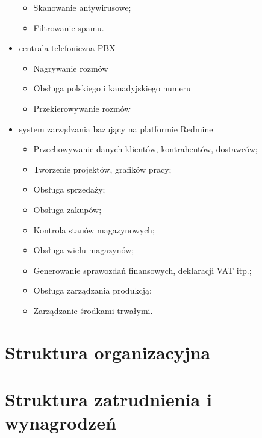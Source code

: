 \begin{itemize}
\begin{itemize}
							\item Skanowanie antywirusowe;
							\item Filtrowanie spamu.
						\end{itemize}
					\item centrala telefoniczna PBX
						\begin{itemize}
							\item Nagrywanie rozmów
							\item Obsługa polskiego i kanadyjskiego numeru
							\item Przekierowywanie rozmów
						\end{itemize}
					\item system zarządzania bazujący na platformie Redmine
						\begin{itemize}
							\item Przechowywanie danych klientów, kontrahentów, dostawców;
							\item Tworzenie projektów, grafików pracy;
							\item Obsługa sprzedaży;
							\item Obsługa zakupów;
							\item Kontrola stanów magazynowych;
							\item Obsługa wielu magazynów;
							\item Generowanie sprawozdań finansowych, deklaracji VAT itp.;
							\item Obsługa zarządzania produkcją;
							\item Zarządzanie środkami trwałymi.
						\end{itemize}
			\end{itemize}

			\section{Struktura organizacyjna}	
		
			
			\section{Struktura zatrudnienia i wynagrodzeń}
		
